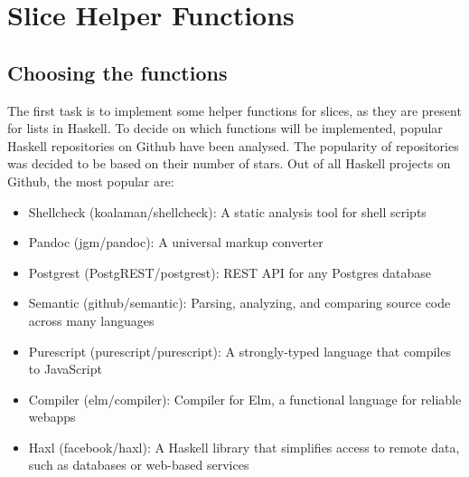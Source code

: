 

\section{Slice Helper Functions}

\subsection{Choosing the functions}

The first task is to implement some helper functions for slices, as they are present for lists in Haskell.
To decide on which functions will be implemented, popular Haskell repositories on Github have been analysed. The
popularity of repositories was decided to be based on their number of stars. Out of all Haskell projects
on Github, the most popular are\cite{github-popular-haskell}:

\begin{itemize}
    \item Shellcheck (koalaman/shellcheck\cite{github-shellcheck}): A static analysis tool for shell scripts
    \item Pandoc (jgm/pandoc\cite{github-pandoc}): A universal markup converter
    \item Postgrest (PostgREST/postgrest\cite{github-postgrest}): REST API for any Postgres database
    \item Semantic (github/semantic\cite{github-semantic}): Parsing, analyzing, and comparing source code across many languages
    \item Purescript (purescript/purescript\cite{github-purescript}): A strongly-typed language that compiles to JavaScript
    \item Compiler (elm/compiler\cite{github-elmcompiler}): Compiler for Elm, a functional language for reliable webapps
    \item Haxl (facebook/haxl\cite{github-haxl}): A Haskell library that simplifies access to remote data, such as databases or web-based services
\end{itemize}

